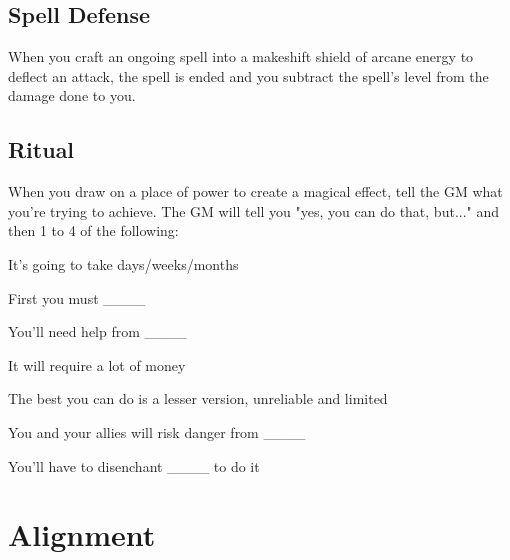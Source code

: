            
\stopitemize
           
\subsection{Spell Defense}    
           

When you craft an ongoing spell into a makeshift shield of arcane energy to deflect an attack, the spell is ended and you subtract the spell's level from the damage done to you.

           
\subsection{Ritual}   
           

When you draw on a place of power to create a magical effect, tell the GM what you're trying to achieve. The GM will tell you "yes, you can do that, but..." and then 1 to 4 of the following:

           
\startitemize[1,packed]
             
\item It's going to take days/weeks/months

             
\item First you must \_\_\_\_

             
\item You'll need help from \_\_\_\_

             
\item It will require a lot of money

             
\item The best you can do is a lesser version, unreliable and limited

             
\item You and your allies will risk danger from \_\_\_\_

             
\item You'll have to disenchant \_\_\_\_ to do it

           
\stopitemize
         

       

       
\section{Alignment}   
       
